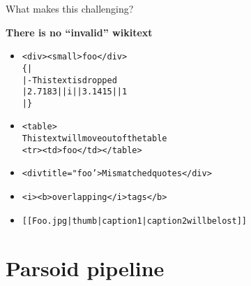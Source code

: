\documentclass[t,xcolor=dvipsnames]{beamer}
\newenvironment{wikitext}[1][\small]%
{\begin{alltt}\bgroup\color{blue}#1}%
{\egroup\end{alltt}}
\begin{document}
\begin{frame}{What makes this challenging?}

{\bf There is no ``invalid'' wikitext}

\begin{itemize}
  \item
    \begin{wikitext}
      <div><small>foo</div> \\
      \{| \\
      |- This text is dropped \\
      | 2.7183 || i || 3.1415 || 1 \\
      |\}
    \end{wikitext}
  \item
    \begin{wikitext}
      <table> \\
      This text will move out of the table \\
      <tr><td>foo</td></table>
    \end{wikitext}
  \item
    \begin{wikitext}
    <div title="foo'>Mismatched quotes</div>
    \end{wikitext}
  \item
    \begin{wikitext}
    <i><b>overlapping</i>tags</b>
    \end{wikitext}
  \item
    \begin{wikitext}[\small]
    [[Foo.jpg|thumb|caption 1|caption 2 will be lost]]
    \end{wikitext}
\end{itemize}

\end{frame}

\section{Parsoid pipeline}
\end{document}
